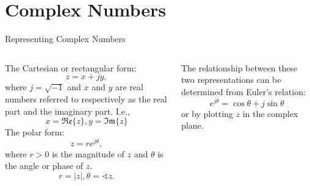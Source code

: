\section{Complex Numbers}

\begin{frame}{Representing Complex Numbers}
    \begin{columns}[T]
        \begin{column}{0.5\textwidth}
            The \alert{Cartesian} or \alert{rectangular} form:
            \begin{equation*}
                z = x + jy,
            \end{equation*}
            where $j = \sqrt{-1}$ and $x$ and $y$ are real numbers referred to respectively as the real part and the imaginary part. I.e.,
            \begin{equation*}
                x = \mathfrak{Re}\{z\}, y = \mathfrak{Im}\{z\}
            \end{equation*}
            The \alert{polar} form:
            \begin{equation*}
                z = re^{j\theta},
            \end{equation*}
            where $r>0$ is the \alert{magnitude} of $z$ and $\theta$ is the \alert{angle} or \alert{phase} of $z$.
            \begin{equation*}
                r = |z|, \theta = \sphericalangle z.
            \end{equation*}
        \end{column}
        \pause
        \begin{column}{0.5\textwidth}
            The relationship between these two representations can be determined from \alert{Euler's relation}:
            \begin{equation*}
                e^{j\theta} = \cos\theta + j\sin\theta
            \end{equation*}
            or by plotting $z$ in the complex plane.
        \end{column}
    \end{columns}
\end{frame}


